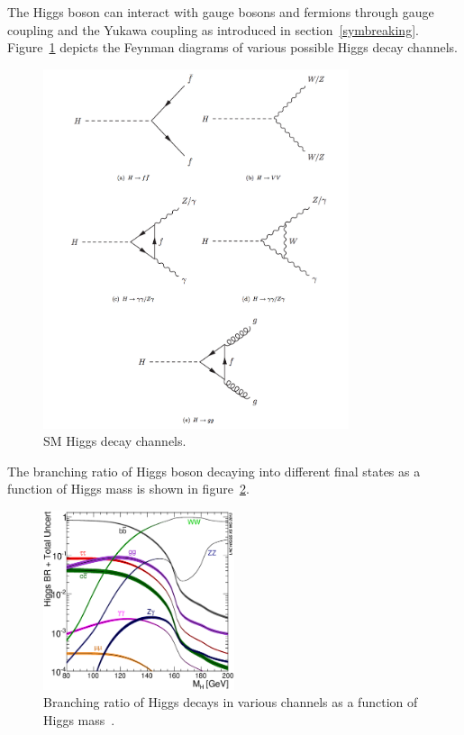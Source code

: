 The Higgs boson can interact with gauge bosons and fermions through gauge coupling and the Yukawa coupling as introduced in section~\ref{symbreaking}.
Figure~\ref{fig:higgs_decay_fd} depicts the Feynman diagrams of various possible Higgs decay channels.
\begin{figure}[!htb]
  \centering
  \includegraphics[width=0.8\textwidth]{figures/Theory/Figures_Feynman_Hdecay.png}
  \caption{SM Higgs decay channels.}
  \label{fig:higgs_decay_fd}
\end{figure}
The branching ratio of Higgs boson decaying into different final states as a function of Higgs mass is shown in figure~\ref{fig:higgs_decay_br}.
\begin{figure}[!htb]
  \centering
  \includegraphics[width=0.5\textwidth]{figures/Theory/Higgs_BR_LM.eps}
  \caption{Branching ratio of Higgs decays in various channels as a function of Higgs mass~\cite{Heinemeyer:1559921}. }
  \label{fig:higgs_decay_br}
\end{figure} 




